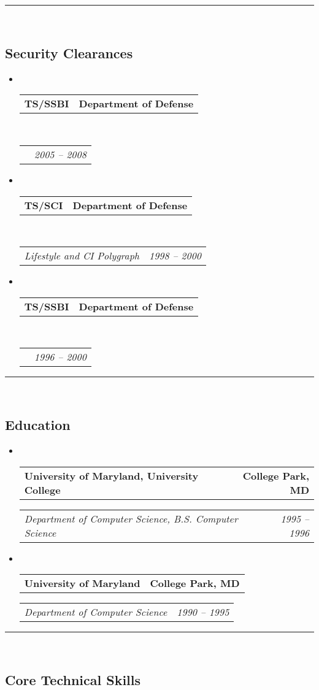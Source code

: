 \documentclass[10pt,letterpaper]{article}
\makeatletter
\newcommand{\headerrow}[2]
{\begin{tabular*}{\linewidth}{l@{\extracolsep{\fill}}r}
	#1 &
	#2 \\
\end{tabular*}}
\makeatother
\begin{document}
\hrule\
\vspace{-0.4em}
\subsection*{Security Clearances}

\begin{itemize}
	\parskip=0.1em

	\item\ 
	\headerrow
		{\textbf{TS/SSBI}}
		{\textbf{Department of Defense}}
	\\
	\headerrow
		{\emph{}}
		{\emph{2005 -- 2008}}
	\item\ 
	\headerrow
		{\textbf{TS/SCI}}
		{\textbf{Department of Defense}}
	\\
	\headerrow
		{\emph{Lifestyle and CI Polygraph}}
		{\emph{1998 -- 2000}}		
	\item\ 
	\headerrow
		{\textbf{TS/SSBI}}
		{\textbf{Department of Defense}}
	\\
	\headerrow
		{\emph{}}
		{\emph{1996 -- 2000}}
\end{itemize}

\hrule\
\vspace{-0.4em}
\subsection*{Education}

\begin{itemize}
	\parskip=0.1em

	\item\ 
	\headerrow
		{\textbf{University of Maryland, University College}}
		{\textbf{College Park, MD}}
	\headerrow
		{\emph{Department of Computer Science, B.S. Computer Science}}
		{\emph{1995 -- 1996}}

	\item\ 
	\headerrow
		{\textbf{University of Maryland}}
		{\textbf{College Park, MD}}
	\headerrow
		{\emph{Department of Computer Science}}
		{\emph{1990 -- 1995}}
\end{itemize}

\hrule\
\vspace{-0.4em}
\subsection*{Core Technical Skills}
\end{document}
